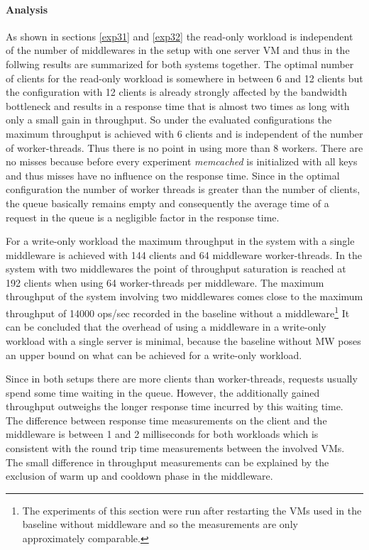 \documentclass[report.tex]{subfiles}
\begin{document}
\paragraph{Analysis}

As shown in sections \ref{exp31} and \ref{exp32} the read-only workload is independent of the number of middlewares in the setup with one server VM and thus in the follwing results are summarized for both systems together.
The optimal number of clients for the read-only workload is somewhere in between 6 and 12 clients but the configuration with 12 clients is already strongly affected by the bandwidth bottleneck and results in a response time that is almost two times as long with only a small gain in throughput. So under the evaluated configurations the maximum throughput is achieved with 6 clients and is independent of the number of worker-threads. Thus there is no point in using more than 8 workers. 
There are no misses because before every experiment \emph{memcached} is initialized with all keys and thus misses have no influence on the response time. Since in the optimal configuration the number of worker threads is greater than the number of clients, the queue basically remains empty and consequently the average time of a request in the queue is a negligible factor in the response time.

For a write-only workload the maximum throughput  in the system with a single middleware is achieved with 144 clients and 64 middleware worker-threads. In the system with two middlewares the point of throughput saturation is reached at 192 clients when using 64 worker-threads per middleware. The maximum throughput of the system involving two middlewares comes close to the maximum throughput of 14000 ops/sec recorded in the baseline without a middleware\footnote{The experiments of this section were run after restarting the VMs used in the baseline without middleware and so the measurements are only approximately comparable.} 
It can be concluded that the overhead of using a middleware in a write-only workload with a single server is minimal, because the baseline without MW poses an upper bound on what can be achieved for a write-only workload.

Since in both setups there are more clients than worker-threads, requests usually spend some time waiting in the queue. However, the additionally gained throughput outweighs the longer response time incurred by this waiting time.
The difference between response time measurements on the client and the middleware is between 1 and 2 milliseconds for both workloads which is consistent with the round trip time measurements between the involved VMs. The small difference in throughput measurements can be explained by the exclusion of warm up and cooldown phase in the middleware. 
\end{document}
